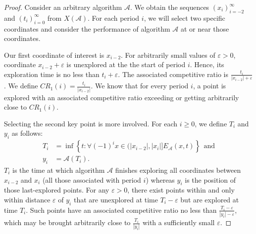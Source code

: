 \begin{appendixonly}
\begin{proof}
  Consider an arbitrary algorithm $\mathcal{A}$. We obtain the sequences $\left(x_i\right)_{i=-2}^{\infty}$ and $\left(t_i\right)_{i=0}^{\infty}$ from $X(\mathcal{A})$. For each period $i$, we will select two specific coordinates and consider the performance of algorithm $\mathcal{A}$ at or near those coordinates.
  
  Our first coordinate of interest is $x_{i-2}$. For arbitrarily small values of $\varepsilon>0$, coordinate $x_{i-2}+\varepsilon$ is unexplored at the the start of period $i$. Hence, its exploration time is no less than $t_i+\varepsilon$. The associated competitive ratio is $\frac{t_i}{|x_{i-2}|+\varepsilon}$. We define $CR_1(i) = \frac{t_i}{|x_{i-2}|}$. We know that for every period $i$, a point is explored with an associated competitive ratio exceeding or getting arbitrarily close to $CR_1(i)$.

  Selecting the second key point is more involved. For each $i\geq 0$, we define $T_i$ and $y_i$ as follows:
  \begin{align*}
    T_i &= \inf\left\{t : \forall (-1)^ix\in (|x_{i-2}|,|x_i|] E_{\mathcal{A}}(x,t)\right\} ~~\text{and} \\
    y_i &= \mathcal{A}(T_i) .
  \end{align*}
  $T_i$ is the time at which algorithm $\mathcal{A}$ finishes exploring all coordinates between $x_{i-2}$ and $x_i$ (all those associated with period $i$) whereas $y_i$ is the position of those last-explored points. For any $\varepsilon>0$, there exist points within and only within distance $\varepsilon$ of $y_i$ that are unexplored at time $T_i-\varepsilon$ but are explored at time $T_i$. Such points have an associated competitive ratio no less than $\frac{T_i-\varepsilon}{|y_i|-\varepsilon}$, which may be brought arbitrarily close to $\frac{T_i}{|y_i|}$ with a sufficiently small $\varepsilon$.


\end{proof}
\end{appendixonly}
